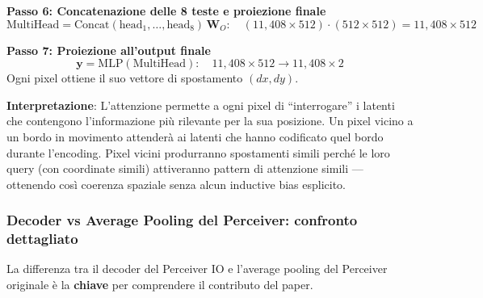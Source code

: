 \documentclass[12pt,a4paper]{article}
\begin{document}
\begin{examplebox}
\textbf{Passo 6: Concatenazione delle 8 teste e proiezione finale}
\[
\text{MultiHead} = \text{Concat}(\text{head}_1, \ldots, \text{head}_8) \, \mathbf{W}_O: \quad (11{,}408 \times 512) \cdot (512 \times 512) = 11{,}408 \times 512
\]

\textbf{Passo 7: Proiezione all'output finale}
\[
\mathbf{y} = \text{MLP}(\text{MultiHead}): \quad 11{,}408 \times 512 \to 11{,}408 \times 2
\]
Ogni pixel ottiene il suo vettore di spostamento $(dx, dy)$.

\textbf{Interpretazione}: L'attenzione permette a ogni pixel di ``interrogare'' i latenti che contengono l'informazione pi\`u rilevante per la sua posizione. Un pixel vicino a un bordo in movimento attender\`a ai latenti che hanno codificato quel bordo durante l'encoding. Pixel vicini produrranno spostamenti simili perch\'e le loro query (con coordinate simili) attiveranno pattern di attenzione simili --- ottenendo cos\`i coerenza spaziale senza alcun inductive bias esplicito.
\end{examplebox}

\subsubsection{Decoder vs Average Pooling del Perceiver: confronto dettagliato}

La differenza tra il decoder del Perceiver IO e l'average pooling del Perceiver originale \`e la \textbf{chiave} per comprendere il contributo del paper.
\end{document}
